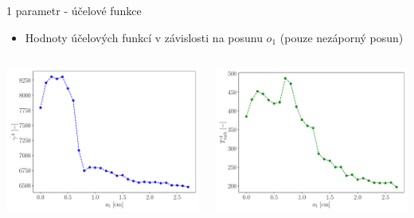 \documentclass[aspectratio=169,xcolor=dvipsnames]{beamer}
\begin{document}
\begin{frame}{1 parametr - účelové funkce}
	\begin{itemize}
		\item Hodnoty účelových funkcí v závislosti na posunu $o_1$ (pouze nezáporný posun)
	\end{itemize}
	\begin{columns}
		\begin{column}{.5\textwidth}
			\includegraphics[width=1\linewidth, trim={0 0 0 0}, clip]{Images/stress.pdf}			
		\end{column}
		\begin{column}{.5\textwidth}
			\includegraphics[width=1\linewidth, trim={0 0 0 0}, clip]{Images/tke.pdf}
		\end{column}
	\end{columns}
\end{frame}
\end{document}
